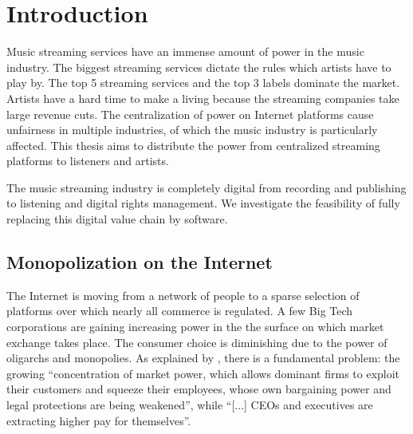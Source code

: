\chapter{Introduction}
\label{introduction}
Music streaming services have an immense amount of power in the music industry. The biggest streaming services dictate the rules which artists have to play by. The top 5 streaming services and the top 3 labels dominate the market. Artists have a hard time to make a living because the streaming companies take large revenue cuts. The centralization of power on Internet platforms cause unfairness in multiple industries, of which the music industry is particularly affected. This thesis aims to distribute the power from centralized streaming platforms to listeners and artists.

The music streaming industry is completely digital\; from recording and publishing to listening and digital rights management. We investigate the feasibility of fully replacing this digital value chain by software. 


\section{Monopolization on the Internet}
The Internet is moving from a network of people to a sparse selection of platforms over which nearly all commerce is regulated. A few Big Tech corporations are gaining increasing power in the the surface on which market exchange takes place. The consumer choice is diminishing due to the power of oligarchs and monopolies. As explained by \citep{stiglitz2019market}, there is a fundamental problem: the growing ``concentration of market power, which allows dominant firms to exploit their customers and squeeze their employees, whose own bargaining power and legal protections are being weakened'', while ``[...] CEOs and executives are extracting higher pay for themselves''.

